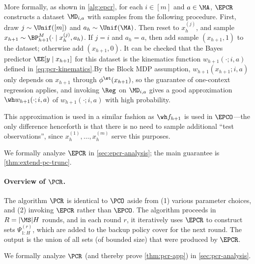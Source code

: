 More formally, as shown in \cref{alg:epcr}, for each $i \in [m]$ and $a \in \MA$, $\EPCR$ constructs a dataset $\MD_{i,a}$ with samples from the following procedure. First, draw $j \sim \Unif([m])$ and $a_h \sim \Unif(\MA)$. Then reset to $x_h^{(j)}$, and sample $x_{h+1} \sim \BP^M_{h+1}(\cdot\mid{}x_h^{(j)},a_h)$. If $j = i$ and $a_h = a$, then add sample $(x_{h+1},1)$ to the dataset; otherwise add $(x_{h+1},0)$. It can be checked that the Bayes predictor $\EE[y\mid{}x_{h+1}]$ for this dataset is the kinematics function $w_{h+1}(\cdot;i,a)$ defined in \cref{eq:pcr-kinematics}.By the Block MDP assumption, $w_{h+1}(x_{h+1};i,a)$ only depends on $x_{h+1}$ through $\phi^\st(x_{h+1})$, so the guarantee of one-context regression applies, and invoking $\Reg$ on $\MD_{i,a}$ gives a good approximation $\wh w_{h+1}(\cdot;i,a)$ of $w_{h+1}(\cdot;i,a)$ with high probability.

This approximation is used in a similar fashion as $\wh f_{h+1}$ is used in $\EPCO$---the only difference henceforth is that there is no need to sample additional ``test observations'', since $x_h^{(1)},\dots,x_h^{(m)}$ serve this purposes.

We formally analyze $\EPCR$ in \cref{sec:epcr-analysis}; the main guarantee is \cref{thm:extend-pc-trunc}.

\paragraph{Overview of $\PCR$.} The algorithm $\PCR$ is identical to $\PCO$ aside from (1) various parameter choices, and (2) invoking $\EPCR$ rather than $\EPCO$. The algorithm proceeds in $R = |\MS|H$ rounds, and in each round $r$, it iteratively uses $\EPCR$ to construct sets $\Psi^{(r)}_{1:H}$, which are added to the backup policy cover for the next round. The output is the union of all sets (of bounded size) that were produced by $\EPCR$.

We formally analyze $\PCR$ (and thereby prove \cref{thm:pcr-app}) in \cref{sec:pcr-analysis}.



